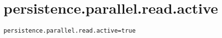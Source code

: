 \section{persistence.parallel.read.active}
\label{configuration:PersistenceParallelReadActive}
\AvailableInJavaOnly{\TODO}
\begin{lstlisting}[style=Props,caption={Usage example for \textit{persistence.parallel.read.active}}]
persistence.parallel.read.active=true
\end{lstlisting}
